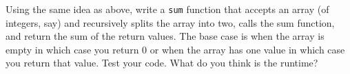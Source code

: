 Using the same idea as above, write a \verb!sum! function
that accepts an array (of integers, say) and recursively
splits the array into two, calls the sum function, and return the 
sum of the return values.
The base case is when the array is empty in which case you return 0
or when the array has one value in which case you return that value.
Test your code.
What do you think is the runtime?
